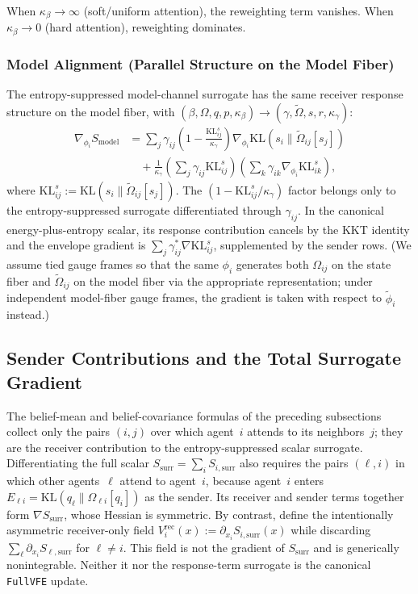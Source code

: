 \documentclass[11pt]{article}
\begin{document}
When $\kappa_\beta \to \infty$ (soft/uniform attention), the reweighting term vanishes. When $\kappa_\beta \to 0$ (hard attention), reweighting dominates.

\subsubsection*{Model Alignment (Parallel Structure on the Model Fiber)}

The entropy-suppressed model-channel surrogate has the same receiver response structure on the model fiber, with $(\beta, \Omega, q, p, \kappa_\beta) \to (\gamma, \tilde\Omega, s, r, \kappa_\gamma)$:
\begin{equation}
\begin{aligned}
\nabla_{\phi_i} S_{\mathrm{model}}
&= \sum_j \gamma_{ij}\left(1 - \frac{\mathrm{KL}^s_{ij}}{\kappa_\gamma}\right)\nabla_{\phi_i}\mathrm{KL}(s_i \| \tilde{\Omega}_{ij}[s_j]) \\
&\quad + \frac{1}{\kappa_\gamma}\left(\sum_j \gamma_{ij}\mathrm{KL}^s_{ij}\right)\left(\sum_k \gamma_{ik}\nabla_{\phi_i}\mathrm{KL}^s_{ik}\right),
\end{aligned}
\end{equation}
where $\mathrm{KL}^s_{ij} := \mathrm{KL}(s_i \| \tilde{\Omega}_{ij}[s_j])$. The $(1 - \mathrm{KL}^s_{ij}/\kappa_\gamma)$ factor belongs only to the entropy-suppressed surrogate differentiated through $\gamma_{ij}$. In the canonical energy-plus-entropy scalar, its response contribution cancels by the KKT identity and the envelope gradient is $\sum_j\gamma_{ij}^*\nabla\mathrm{KL}^s_{ij}$, supplemented by the sender rows. (We assume tied gauge frames so that the same $\phi_i$ generates both $\Omega_{ij}$ on the state fiber and $\tilde\Omega_{ij}$ on the model fiber via the appropriate representation; under independent model-fiber gauge frames, the gradient is taken with respect to $\tilde\phi_i$ instead.)

\subsection*{Sender Contributions and the Total Surrogate Gradient}

The belief-mean and belief-covariance formulas of the preceding subsections collect only the pairs $(i,j)$ over which agent~$i$ attends to its neighbors~$j$; they are the receiver contribution to the entropy-suppressed scalar surrogate. Differentiating the full scalar $S_{\mathrm{surr}}=\sum_iS_{i,\mathrm{surr}}$ also requires the pairs $(\ell,i)$ in which other agents~$\ell$ attend to agent~$i$, because agent~$i$ enters $E_{\ell i}=\mathrm{KL}(q_\ell\|\Omega_{\ell i}[q_i])$ as the sender. Its receiver and sender terms together form $\nabla S_{\mathrm{surr}}$, whose Hessian is symmetric. By contrast, define the intentionally asymmetric receiver-only field $V_i^{\mathrm{rec}}(x):=\partial_{x_i}S_{i,\mathrm{surr}}(x)$ while discarding $\sum_\ell\partial_{x_i}S_{\ell,\mathrm{surr}}$ for $\ell\ne i$. This field is not the gradient of $S_{\mathrm{surr}}$ and is generically nonintegrable. Neither it nor the response-term surrogate is the canonical \texttt{FullVFE} update.
\end{document}
